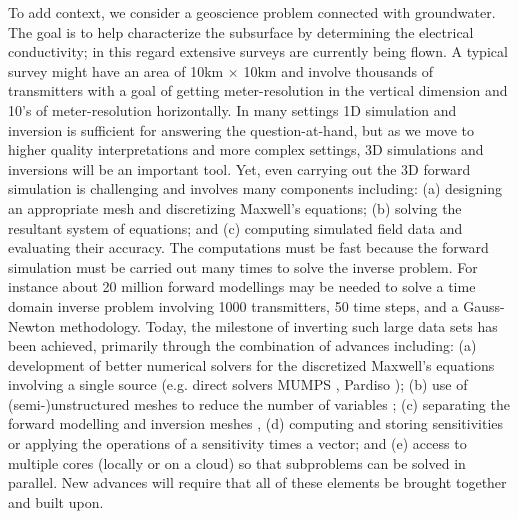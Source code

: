 \documentclass[paper]{geophysics}
\begin{document}
To add context, we consider a geoscience problem connected with groundwater. The goal is to help characterize the subsurface by determining the electrical conductivity; in this regard extensive surveys are currently being flown. A typical survey might have an area of 10km $\times$ 10km and  involve thousands of transmitters with a goal of getting meter-resolution in the vertical dimension and 10’s of meter-resolution horizontally. In many settings 1D simulation and inversion is sufficient for answering the question-at-hand, but as we move to higher quality interpretations and more complex settings, 3D simulations and inversions will be an important tool. Yet, even carrying out the 3D forward simulation is challenging and involves many components including: (a) designing an appropriate mesh and discretizing Maxwell’s equations; (b) solving the resultant system of equations; and (c) computing simulated field data and evaluating their accuracy. The computations must be fast because the forward simulation must be carried out many times to solve the inverse problem. For instance about 20 million forward modellings may be needed to solve a time domain inverse problem involving 1000 transmitters, 50 time steps, and a Gauss-Newton methodology. Today, the milestone of inverting such large data sets has been achieved, primarily through the combination of advances including: (a) development of better numerical solvers for the discretized Maxwell’s equations involving a single source (e.g. direct solvers MUMPS \citep{Amestoy2001, Amestoy2006}, Pardiso \citep{DeConinck2016, Verbosio2017, Kourounis2018}); (b) use of (semi-)unstructured meshes to reduce the number of variables \citep{Haber2007}; (c) separating the forward modelling and inversion meshes \citep{Yang2014a, Haber2014b}, (d) computing and storing sensitivities or applying the operations of a sensitivity times a vector; and (e) access to multiple cores (locally or on a cloud) so that subproblems can be solved in parallel. New advances will require that all of these elements be brought together and built upon.
\end{document}
